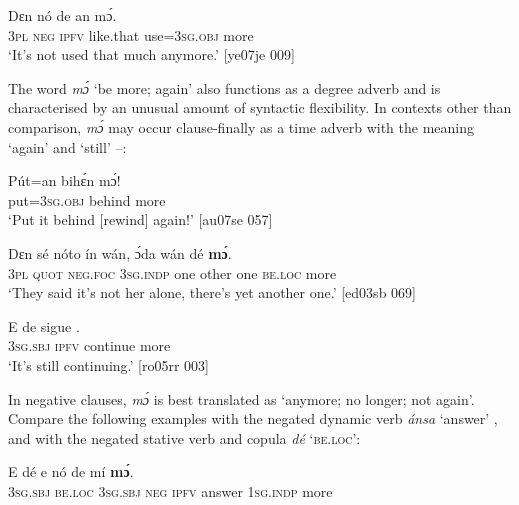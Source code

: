 \ea%
    \label{ex:key:864}
    \gll Dɛn  nó  de      an    mɔ́.\\
\textsc{3pl}  \textsc{neg}  \textsc{ipfv}  like.that  use=\textsc{3sg.obj}  more\\

\glt ‘It’s not used that much anymore.’ [ye07je 009]
\z

The word \textit{mɔ́} ‘be more; again’ also functions as a degree adverb and is characterised by an unusual amount of syntactic flexibility. In contexts other than comparison, \textit{mɔ́} may occur clause-finally as a time adverb with the meaning ‘again’  and ‘still’ –:


\ea%
    \label{ex:key:865}
    \gll Pút=an    bihɛ́n  mɔ́!\\
put=\textsc{3sg.obj}  behind  more\\

\glt ‘Put it behind [rewind] again!’ [au07se 057]
\z


\ea%
    \label{ex:key:866}
    \gll Dɛn  sé    nóto  ín    wán,  ɔ́da    wán    dé    \textbf{mɔ́}.\\
\textsc{3pl}  \textsc{quot}    \textsc{neg}.\textsc{foc}  \textsc{3sg.indp}  one    other  one    \textsc{be.loc}  more\\

\glt ‘They said it’s not her alone, there’s yet another one.’ [ed03sb 069]
\z


\ea%
    \label{ex:key:867}
    \gll E    de  sigue  .\\
\textsc{3sg.sbj}  \textsc{ipfv}  continue  more\\

\glt ‘It’s still continuing.’ [ro05rr 003]
\z

In negative clauses, \textit{mɔ́} is best translated as ‘anymore; no longer; not again’. Compare the following examples with the negated dynamic verb \textit{ánsa} ‘answer’ , and  with the negated stative verb and copula \textit{dé} ‘\textsc{be.loc}’:


\ea%
    \label{ex:key:868}
    \gll E    dé    e    nó  de   mí    \textbf{mɔ́}.\\
\textsc{3sg.sbj}  \textsc{be.loc}  \textsc{3sg.sbj}  \textsc{neg}  \textsc{ipfv}  answer  \textsc{1sg.indp}  more\\

